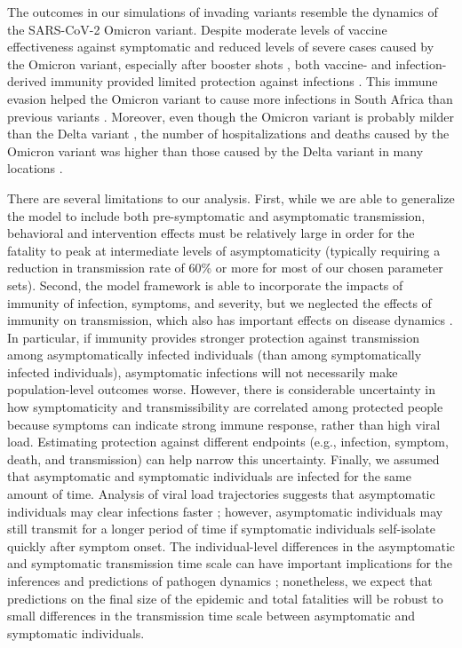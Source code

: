 \documentclass[12pt]{article}
\begin{document}
The outcomes in our simulations of invading variants resemble the dynamics of the SARS-CoV-2 Omicron variant.
Despite moderate levels of vaccine effectiveness against symptomatic and reduced levels of severe cases caused by the Omicron variant, especially after booster shots \citep{andres2022omicron}, both vaccine- and infection-derived immunity provided limited protection against infections \citep{pearson2021omicron}.
This immune evasion helped the Omicron variant to cause more infections in South Africa than previous variants \citep{sun2022omicron}.
Moreover, even though the Omicron variant is probably milder than the Delta variant \citep{MENNI20221618,ulloa2022estimates}, the number of hospitalizations and deaths caused by the Omicron variant was higher than those caused by the Delta variant in many locations \citep{Iacobuccio254,faust2022omicron,sigal2022estimating}.

There are several limitations to our analysis.
First, while we are able to generalize the model to include both pre-symptomatic and asymptomatic transmission, behavioral and intervention effects must be relatively large in order for the fatality to peak at intermediate levels of asymptomaticity (typically requiring a reduction in transmission rate of 60\% or more for most of our chosen parameter sets).
Second, the model framework is able to incorporate the impacts of immunity of infection, symptoms, and severity,
but we neglected the effects of immunity on transmission, which also has important effects on disease dynamics \citep{saad2020immune}.
In particular, if immunity provides stronger protection against transmission among asymptomatically infected individuals (than among symptomatically infected individuals), asymptomatic infections will not necessarily make population-level outcomes worse. 
However, there is considerable uncertainty in how symptomaticity and transmissibility are correlated among protected people because symptoms can indicate strong immune response, rather than high viral load. 
Estimating protection against different endpoints (e.g., infection, symptom, death, and transmission) can help narrow this uncertainty.
Finally, we assumed that asymptomatic and symptomatic individuals are infected for the same amount of time.
Analysis of viral load trajectories suggests that asymptomatic individuals may clear infections faster \citep{Kissler2020};
however, asymptomatic individuals may still transmit for a longer period of time if symptomatic individuals self-isolate quickly after symptom onset.
The individual-level differences in the asymptomatic and symptomatic transmission time scale can have important implications for the inferences and predictions of pathogen dynamics \citep{park2020time,harris2022time};
nonetheless, we expect that predictions on the final size of the epidemic and total fatalities will be robust to small differences in the transmission time scale between asymptomatic and symptomatic individuals.
\end{document}
